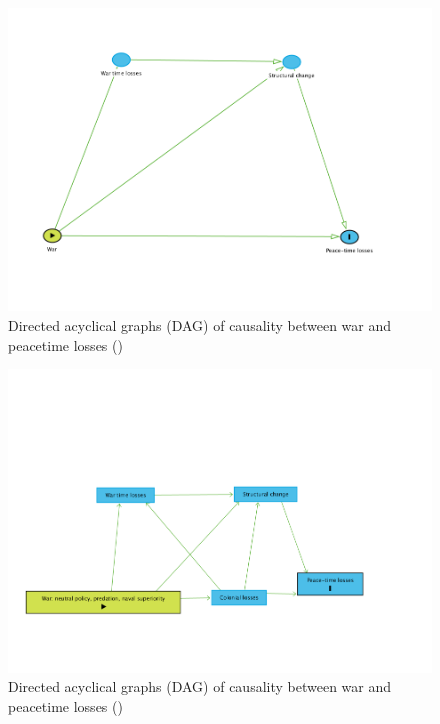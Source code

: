 \documentclass[12pt,a4paper,notitlepage,english]{article}
\begin{document}
\begin{appendix}
\begin{center}
	\begin{figure}[h!]
		\centering
		\caption{Directed acyclical graphs (DAG) of causality between war and peacetime losses (\cite{Pearl2000,Pearl2018,Schneider2020})}
		\label{DAG}
		\includegraphics[scale=0.8]{dagitty-model-War-to-PeaceTimeLosses.png}
	\end{figure}


	\begin{figure}[h!]
	\centering
	\caption{Directed acyclical graphs (DAG) of causality between war and peacetime losses (\cite{Pearl2000,Pearl2018,Schneider2020})}
	\label{DAG}
	\includegraphics[scale=0.8]{dagitty-model-War-to-PeaceTimeLosses-othergo.png}
\end{figure}
\end{center}


\end{appendix}
\end{document}

